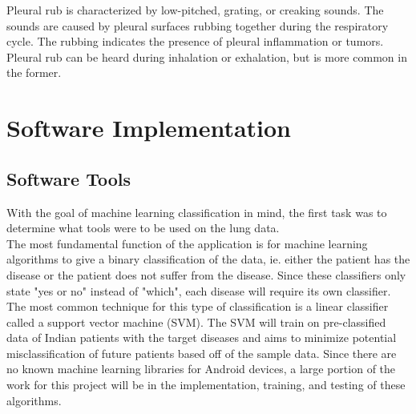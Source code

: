 \documentclass{article}
\begin{document}
Pleural rub is characterized by low-pitched, grating, or creaking sounds. The sounds are caused by pleural surfaces rubbing together during the respiratory cycle. The rubbing indicates the presence of pleural inflammation or tumors. Pleural rub can be heard during inhalation or exhalation, but is more common in the former. \cite{rnceus}

\newpage

\section{Software Implementation}

\subsection{Software Tools}

 With the goal of machine learning classification in mind, the first task was to determine what tools were to be used on the lung data. \\
 
 The most fundamental function of the application is for machine learning algorithms to give a binary classification of the data, ie. either the patient has the disease or the patient does not suffer from the disease. Since these classifiers only state "yes or no" instead of "which", each disease will require its own classifier. The most common technique for this type of classification is a linear classifier called a support vector machine (SVM). The SVM will train on pre-classified data of Indian patients with the target diseases and aims to minimize potential misclassification of future patients based off of the sample data. Since there are no known machine learning libraries for Android devices, a large portion of the work for this project will be in the implementation, training, and testing of these algorithms.\\
 
\end{document}
